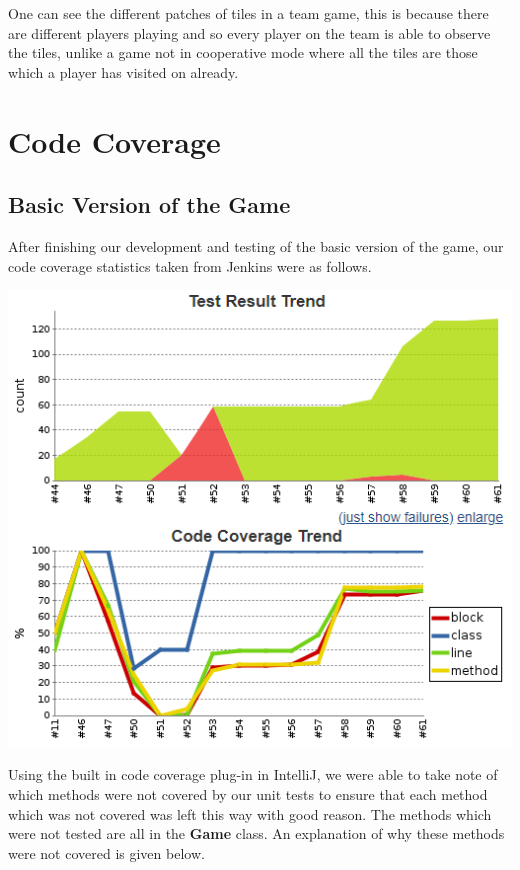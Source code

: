 \documentclass[a4paper,12pt]{extarticle}
\begin{document}
\noindent One can see the different patches of tiles in a team game, this is because there are different players playing and so every player on the team is able to observe the tiles, unlike a game not in cooperative mode where all the tiles are those which a player has visited on already.\\

\newpage 
\section{Code Coverage}
\subsection{Basic Version of the Game}

After finishing our development and testing of the basic version of the game, our code coverage statistics taken from Jenkins were as follows.

\begin{center}
\includegraphics[scale = 0.75]{Figure4.png}\\
\end{center}

\noindent Using the built in code coverage plug-in in IntelliJ, we were able to take note of which methods were not covered by our unit tests to ensure that each method which was not covered was left this way with good reason. The methods which were not tested are all in the \textbf{Game} class. An explanation of why these methods were not covered is given below.
\end{document}
